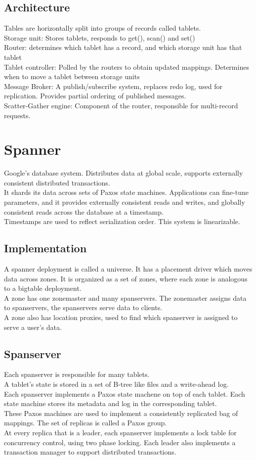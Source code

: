 \subsection{Architecture}
Tables are horizontally split into groups of records called tablets. \\
Storage unit: Stores tablets, responds to get(), scan() and set()\\
Router: determines which tablet has a record, and which storage unit has that tablet\\
Tablet controller: Polled by the routers to obtain updated mappings. Determines when to move a tablet between storage units\\
Message Broker: A publish/subscribe system, replaces redo log, used for replication. Provides partial ordering of published messages.\\
Scatter-Gather engine: Component of the router, responsible for multi-record requests.

\section{Spanner}
Google's database system. Distributes data at global scale, supports externally consistent distributed transactions.\\
It shards its data across sets of Paxos state machines. Applications can fine-tune parameters, and it provides externally consistent reads and writes, and globally consistent reads across the database at a timestamp.\\
Timestamps are used to reflect serialization order. This system is linearizable.
\subsection{Implementation}
A spanner deployment is called a universe. It has a placement driver which moves data across zones. It is organized as a set of zones, where each zone is analogous to a bigtable deployment. \\
A zone has one zonemaster and many spanservers. The zonemaster assigns data to spanservers, the spanservers serve data to clients. \\
A zone also has location proxies, used to find which spanserver is assigned to serve a user's data.
\subsection{Spanserver}
Each spanserver is responsible for many tablets. \\
A tablet's state is stored in a set of B-tree like files and a write-ahead log. \\
Each spanserver implements a Paxos state machene on top of each tablet. Each state machine stores its metadata and log in the corresponding tablet.\\
These Paxos machines are used to implement a consistently replicated bag of mappings. The set of replicas is called a Paxos group.\\
At every replica that is a leader, each spanserver implements a lock table for concurrency control, using two phase locking. Each leader also implements a transaction manager to support distributed transactions.
